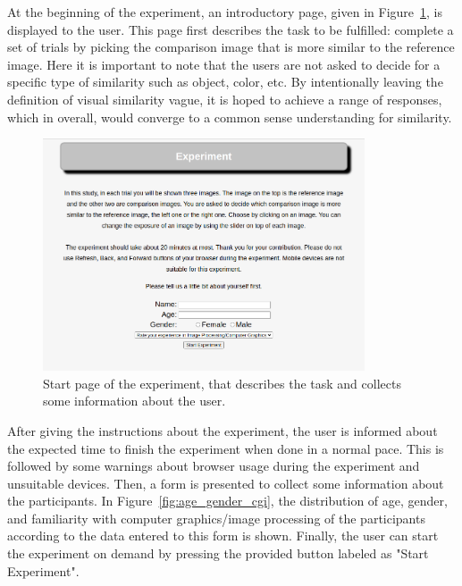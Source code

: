 At the beginning of the experiment, an introductory page, given in Figure~\ref{fig:experiment_start}, is displayed to the user. This page first describes the task to be fulfilled: complete a set of trials by picking the comparison image that is more similar to the reference image. Here it is important to note that the users are not asked to decide for a specific type of similarity such as object, color, etc. By intentionally leaving the definition of visual similarity vague, it is hoped to achieve a range of responses, which in overall, would converge to a common sense understanding for similarity.
\begin{figure}
\begin{center}
\includegraphics[width=0.85\textwidth]{figures/chapter3/experiment_start.png}
\caption{Start page of the experiment, that describes the task and collects some information about the user.}
\label{fig:experiment_start}
\end{center}
\end{figure}

After giving the instructions about the experiment, the user is informed about the expected time to finish the experiment when done in a normal pace. This is followed by some warnings about browser usage during the experiment and unsuitable devices. Then, a form is presented to collect some information about the participants. In Figure~\ref{fig:age_gender_cgi}, the distribution of age, gender, and familiarity with computer graphics/image processing of the participants according to the data entered to this form is shown. Finally, the user can start the experiment on demand by pressing the provided button labeled as "Start Experiment".

